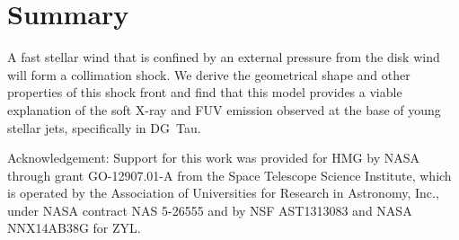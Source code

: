 \section{Summary}
\label{sect:summary}
A fast stellar wind that is confined by an external pressure from the disk wind will form a collimation shock. We derive the geometrical shape and other properties of this shock front and find that this model provides a viable explanation of the soft X-ray and FUV emission observed at the base of young stellar jets, specifically in DG~Tau.

Acknowledgement: Support for this work was provided for HMG by NASA through grant GO-12907.01-A from the Space Telescope Science Institute, which is operated by the Association of Universities for Research in Astronomy, Inc., under NASA contract NAS 5-26555 and by NSF AST1313083 and NASA NNX14AB38G for ZYL.